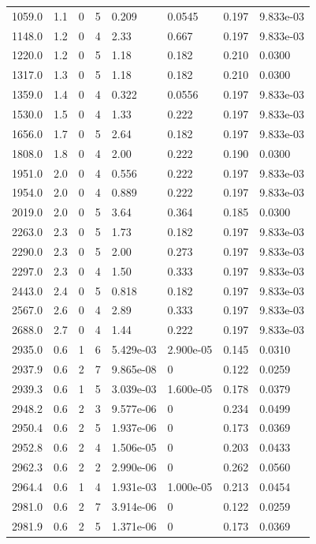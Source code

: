 \documentclass[preview]{standalone}
\begin{document}
{{\begin{tabular}{L{1.2cm}C{1.2cm} C{0.3cm}C{0.5cm} C{1.4cm}C{1.4cm} C{1.4cm}C{1.4cm}}
  1059.0  &   1.1  & 0     &  5 &  0.209  & 0.0545  & 0.197 &  9.833e-03   \\ 
  1148.0  &   1.2  & 0     &  4 &  2.33  & 0.667  & 0.197 &  9.833e-03   \\ 
  1220.0  &   1.2  & 0     &  5 &  1.18  & 0.182  & 0.210 &  0.0300   \\ 
  1317.0  &   1.3  & 0     &  5 &  1.18  & 0.182  & 0.210 &  0.0300   \\ 
  1359.0  &   1.4  & 0     &  4 &  0.322  & 0.0556  & 0.197 &  9.833e-03   \\ 
  1530.0  &   1.5  & 0     &  4 &  1.33  & 0.222  & 0.197 &  9.833e-03   \\ 
  1656.0  &   1.7  & 0     &  5 &  2.64  & 0.182  & 0.197 &  9.833e-03   \\ 
  1808.0  &   1.8  & 0     &  4 &  2.00  & 0.222  & 0.190 &  0.0300   \\ 
  1951.0  &   2.0  & 0     &  4 &  0.556  & 0.222  & 0.197 &  9.833e-03   \\ 
  1954.0  &   2.0  & 0     &  4 &  0.889  & 0.222  & 0.197 &  9.833e-03   \\ 
  2019.0  &   2.0  & 0     &  5 &  3.64  & 0.364  & 0.185 &  0.0300   \\ 
  2263.0  &   2.3  & 0     &  5 &  1.73  & 0.182  & 0.197 &  9.833e-03   \\ 
  2290.0  &   2.3  & 0     &  5 &  2.00  & 0.273  & 0.197 &  9.833e-03   \\ 
  2297.0  &   2.3  & 0     &  4 &  1.50  & 0.333  & 0.197 &  9.833e-03   \\ 
  2443.0  &   2.4  & 0     &  5 &  0.818  & 0.182  & 0.197 &  9.833e-03   \\ 
  2567.0  &   2.6  & 0     &  4 &  2.89  & 0.333  & 0.197 &  9.833e-03   \\ 
  2688.0  &   2.7  & 0     &  4 &  1.44  & 0.222  & 0.197 &  9.833e-03   \\ 
  2935.0  &   0.6  & 1     &  6 &  5.429e-03  & 2.900e-05  & 0.145 &  0.0310   \\ 
  2937.9  &   0.6  & 2     &  7 &  9.865e-08  & 0  & 0.122 &  0.0259   \\ 
  2939.3  &   0.6  & 1     &  5 &  3.039e-03  & 1.600e-05  & 0.178 &  0.0379   \\ 
  2948.2  &   0.6  & 2     &  3 &  9.577e-06  & 0  & 0.234 &  0.0499   \\ 
  2950.4  &   0.6  & 2     &  5 &  1.937e-06  & 0  & 0.173 &  0.0369   \\ 
  2952.8  &   0.6  & 2     &  4 &  1.506e-05  & 0  & 0.203 &  0.0433   \\ 
  2962.3  &   0.6  & 2     &  2 &  2.990e-06  & 0  & 0.262 &  0.0560   \\ 
  2964.4  &   0.6  & 1     &  4 &  1.931e-03  & 1.000e-05  & 0.213 &  0.0454   \\ 
  2981.0  &   0.6  & 2     &  7 &  3.914e-06  & 0  & 0.122 &  0.0259   \\ 
  2981.9  &   0.6  & 2     &  5 &  1.371e-06  & 0  & 0.173 &  0.0369   \\ 
\hline 
\end{tabular} 

}}
\end{document}
